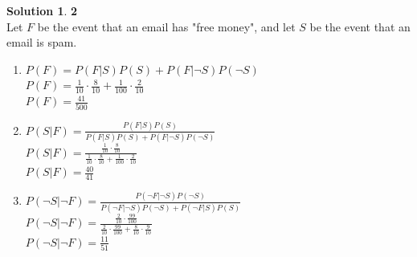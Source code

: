 \documentclass[11pt]{article}
\theoremstyle{definition}
\theoremstyle{nopunct}
\newtheorem*{s}{Solution}
\begin{document}
\begin{s}\textbf{2} \bigskip\\
    Let $F$ be the event that an email has "free
    money", and let $S$ be the event that an email
    is spam.
    \begin{enumerate} 
        \item 
            $P(F) = P(F | S) P(S) + P(F | \neg S) P(\neg S)$
            \bigskip\\
            $P(F) = \frac{1}{10} \cdot \frac{8}{10} +
            \frac{1}{100} \cdot \frac{2}{10}$ 
            \bigskip\\
            $P(F) = \frac{41}{500}$

        \item
            $P(S | F) = \frac{P(F | S) P(S)}
            {P(F | S) P(S) + P(F | \neg S) P(\neg S)}$
            \bigskip\\
            $P(S | F) = \frac{\frac{1}{10} \cdot \frac{8}{10}}
            {\frac{1}{10} \cdot \frac{8}{10} + \frac{1}{100} \cdot \frac{2}{10}}$
            \bigskip\\
            $P(S | F) = \frac{40}{41}$

        \item
            $P(\neg S |\neg  F) = \frac{P(\neg F | \neg S) P(\neg S)}
            {P(\neg F | \neg S) P(\neg S) + P(\neg F | S) P(S)}$
            \bigskip\\
            $P(\neg S | \neg F) = \frac{\frac{2}{10} \cdot \frac{99}{100}}
            {\frac{2}{10} \cdot \frac{99}{100} + \frac{8}{10} \cdot \frac{9}{10}}$
            \bigskip\\
            $P(\neg S | \neg F) = \frac{11}{51}$
    \end{enumerate}
\end{s}

\vspace{10pt}
\end{document}
